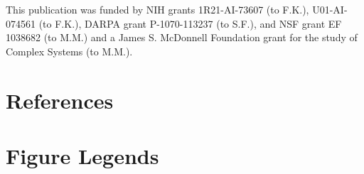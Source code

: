 \documentclass[preprint,10pt,numbers]{elsarticle}
\begin{document}
This publication was funded by NIH grants 1R21-AI-73607 (to F.K.), U01-AI-074561 (to F.K.), DARPA grant P-1070-113237 (to S.F.), and NSF grant EF 1038682 (to M.M.) and a James S. McDonnell Foundation grant for the study of Complex Systems (to M.M.).




\section*{References}
\singlespacing


\pagebreak

\section*{Figure Legends}
\end{document}
